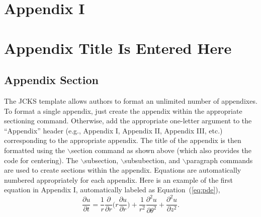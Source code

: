 \documentclass[12pt]{article}
\begin{document}
%
%

{}
{\clearpage}
\setcounter{equation}{0}%
\section{Appendix I}%
\section{Appendix Title Is Entered Here}
\subsection{Appendix Section}
The JCKS template allows authors to format an unlimited number of appendixes.  To format a single appendix, just create the appendix within the appropriate sectioning command. Otherwise, add the appropriate one-letter argument to the ``Appendix'' header (e.g., Appendix I, Appendix II, Appendix III, etc.) corresponding to the appropriate appendix.  The title of the appendix is then formatted using the $\backslash$section command as shown above (which also provides the code for centering).  The $\backslash$subsection, $\backslash$subsubection, and $\backslash$paragraph commands are used to create sections within the appendix.  Equations are automatically numbered appropriately for each appendix.  Here is an example of the first equation in Appendix I, automatically labeled as Equation~(\ref{eq:pde}),
\begin{equation}
\frac{\partial u}{\partial t} = \frac{1}{r}\frac{\partial}{\partial r}\biggl(r\frac{\partial u}{\partial r}\biggr) + \frac{1}{r^2}\frac{\partial^2 u}{\partial \theta^2} + \frac{\partial^2 u}{\partial z^2}.
\label{eq:pde}
\end{equation}
\end{document}
